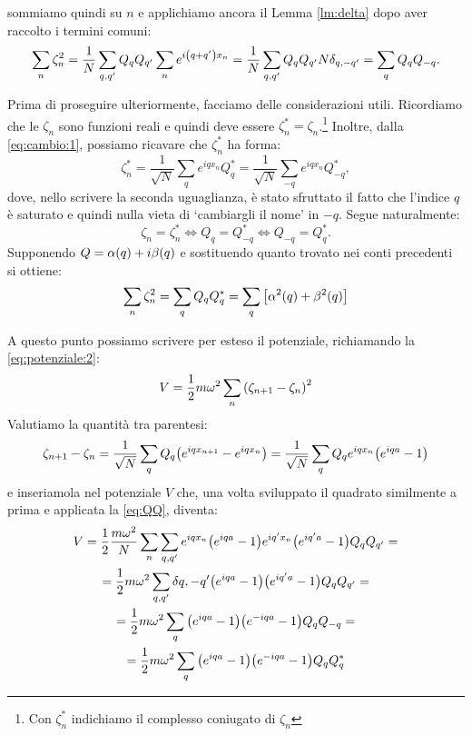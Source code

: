         sommiamo quindi su $n$ e applichiamo ancora il Lemma \ref{lm:delta} dopo aver raccolto i termini comuni: $$\sum_n\zeta_n^2=\frac{1}{N}\sum_{q,q'}Q_qQ_{q'}\sum_ne^{i\qty(q+q')x_n}=\frac{1}{N}\sum_{q,q'}Q_qQ_{q'}N\delta_{q,-q'}=\sum_qQ_qQ_{-q}.$$
        \par Prima di proseguire ulteriormente, facciamo delle considerazioni utili. Ricordiamo che le $\zeta_n$ sono funzioni reali e quindi deve essere $\zeta_n^*=\zeta_n$.\footnote{Con $\zeta_n^*$ indichiamo il complesso coniugato di $\zeta_n$} Inoltre, dalla \eqref{eq:cambio:1}, possiamo ricavare che $\zeta_n^*$ ha forma: $$\zeta_n^*=\frac{1}{\sqrt{N}}\sum_qe^{iqx_n}Q_q^*=\frac{1}{\sqrt{N}}\sum_{-q}e^{iqx_n}Q_{-q}^*,$$ dove, nello scrivere la seconda uguaglianza, \`e stato sfruttato il fatto che l'indice $q$ \`e saturato e quindi nulla vieta di `cambiargli il nome' in $-q$. Segue naturalmente:
        \begin{equation}
            \zeta_n=\zeta_n^* \iff Q_q=Q_{-q}^* \iff Q_{-q}=Q_q^*.
            \label{eq:QQ}
        \end{equation}
        Supponendo $Q=\alpha\qty(q)+i\beta\qty(q)$ e sostituendo quanto trovato nei conti precedenti si ottiene:
        \begin{equation}
            \sum_n\zeta_n^2=\sum_qQ_qQ_q^*=\sum_q\qty[\alpha^2\qty(q)+\beta^2\qty(q)]
            \label{eq:sommazetaquadro}
        \end{equation}
        \par A questo punto possiamo scrivere per esteso il potenziale, richiamando la \eqref{eq:potenziale:2}: $$V=\frac{1}{2}m\omega^2\sum_n\qty(\zeta_{n+1}-\zeta_n)^2$$ Valutiamo la quantit\`a tra parentesi: $$\zeta_{n+1}-\zeta_n=\frac{1}{\sqrt{N}}\sum_qQ_q\qty(e^{iqx_{n+1}}-e^{iqx_n})=\frac{1}{\sqrt{N}}\sum_qQ_qe^{iqx_n}\qty(e^{iqa}-1)$$ e inseriamola nel potenziale $V$ che, una volta sviluppato il quadrato similmente a prima e applicata la \eqref{eq:QQ}, diventa:
        \begin{multline*}
            V=\frac{1}{2}\frac{m\omega^2}{N}\sum_n\sum_{q,q'}e^{iqx_n}\qty(e^{iqa}-1)e^{iq'x_n}\bigl(e^{iq'a}-1\bigr)Q_qQ_{q'}=\\=\frac{1}{2}m\omega^2\sum_{q,q'}\delta{q,-q'}\qty(e^{iqa}-1)\bigl(e^{iq'a}-1\bigr)Q_qQ_{q'}=\\=\frac{1}{2}m\omega^2\sum_q\qty(e^{iqa}-1)\qty(e^{-iqa}-1)Q_qQ_{-q}=\\=\frac{1}{2}m\omega^2\sum_q\qty(e^{iqa}-1)\qty(e^{-iqa}-1)Q_qQ_q^*
        \end{multline*}

